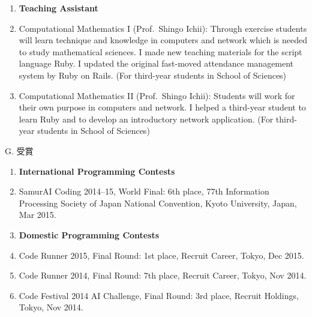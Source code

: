 \documentclass[a4j,twocolumn]{jarticle}
\begin{document}

\begin{enumerate}
\item[] {\bf Teaching Assistant}
\item Computational Mathematics I (Prof.~Shingo Ichii):
      Through exercise students will learn
      technique and knowledge in computers and network
      which is needed to study mathematical sciences.
      I made new teaching materials for the script language Ruby.
      I updated the original fast-moved attendance management system
      by Ruby on Rails. 
      (For third-year students in School of Sciences)
\item Computational Mathematics II (Prof.~Shingo Ichii): 
      Students will work for their own purpose in computers and network.
      I helped a third-year student to learn Ruby and
      to develop an introductory network application.
      (For third-year students in School of Sciences)
\end{enumerate}

\vspace{0.2cm}
\noindent
G. 受賞

\vspace{0.1cm}

\begin{enumerate}
 \item[] {\bf International Programming Contests}
 \item SamurAI Coding 2014--15, World Final: 6th place, 77th Information
       Processing Society of Japan National Convention, Kyoto
       University, Japan, Mar 2015.
 \item[] {\bf Domestic Programming Contests}
 \item Code Runner 2015, Final Round: 1st place,
       Recruit Career, Tokyo, Dec 2015.
 \item Code Runner 2014, Final Round: 7th place,
       Recruit Career, Tokyo, Nov 2014.
 \item Code Festival 2014 AI Challenge, Final Round: 3rd place,
       Recruit Holdings, Tokyo, Nov 2014.
\end{enumerate}
\end{document}
